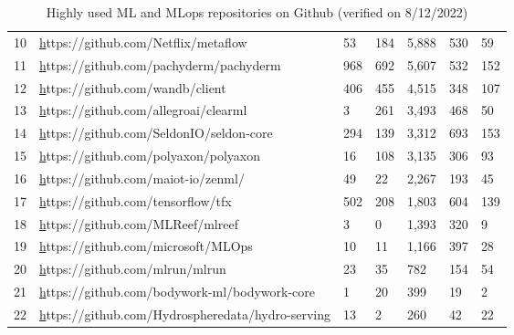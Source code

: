 \documentclass{article}
\begin{document}
\begin{table}[ht]
\begin{tabular}{lllllll}
10          & {\color[HTML]{0563C1} {\ul https://github.com/Netflix/metaflow}}              & 53                & 184             & 5,888          & 530            & 59                \\
11          & {\color[HTML]{0563C1} {\ul https://github.com/pachyderm/pachyderm}}           & 968               & 692             & 5,607          & 532            & 152               \\
12          & {\color[HTML]{0563C1} {\ul https://github.com/wandb/client}}                  & 406               & 455             & 4,515          & 348            & 107               \\
13          & {\color[HTML]{0563C1} {\ul https://github.com/allegroai/clearml}}             & 3                 & 261             & 3,493          & 468            & 50                \\
14          & {\color[HTML]{0563C1} {\ul https://github.com/SeldonIO/seldon-core}}          & 294               & 139             & 3,312          & 693            & 153               \\
15          & {\color[HTML]{0563C1} {\ul https://github.com/polyaxon/polyaxon}}             & 16                & 108             & 3,135          & 306            & 93                \\
16          & {\color[HTML]{0563C1} {\ul https://github.com/maiot-io/zenml/}}               & 49                & 22              & 2,267          & 193            & 45                \\
17          & {\color[HTML]{0563C1} {\ul https://github.com/tensorflow/tfx}}                & 502               & 208             & 1,803          & 604            & 139               \\
18          & {\color[HTML]{0563C1} {\ul https://github.com/MLReef/mlreef}}                 & 3                 & 0               & 1,393          & 320            & 9                 \\
19          & {\color[HTML]{0563C1} {\ul https://github.com/microsoft/MLOps}}               & 10                & 11              & 1,166          & 397            & 28                \\
20          & {\color[HTML]{0563C1} {\ul https://github.com/mlrun/mlrun}}                   & 23                & 35              & 782            & 154            & 54                \\
21          & {\color[HTML]{0563C1} {\ul https://github.com/bodywork-ml/bodywork-core}}     & 1                 & 20              & 399            & 19             & 2                 \\
22          & {\color[HTML]{0563C1} {\ul https://github.com/Hydrospheredata/hydro-serving}} & 13                & 2               & 260            & 42             & 22               
\end{tabular}
\caption{Highly used ML and MLops repositories on Github (verified on 8/12/2022)}
\label{tab:my-table2}
\end{table}
\end{document}
